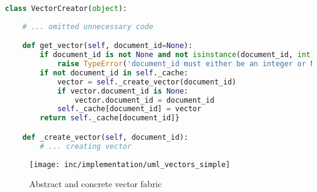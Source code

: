 \begin{lstlisting}[language=Python,caption={Dynamic programming},label={lst:dynamic-programming},float=h]
class VectorCreator(object):
    
    # ... omitted unnecessary code

    def get_vector(self, document_id=None):
        if document_id is not None and not isinstance(document_id, int):
            raise TypeError('document_id must either be an integer or None')
        if not document_id in self._cache:
            vector = self._create_vector(document_id)
            if vector.document_id is None:
                vector.document_id = document_id
            self._cache[document_id] = vector
        return self._cache[document_id]}

    def _create_vector(self, document_id):
        # ... creating vector
\end{lstlisting}


\begin{figure}[h]
    \center
    \texttt{[image: inc/implementation/uml\_vectors\_simple]}
    \caption{Abstract and concrete vector fabric}
    \label{fig:uml-vectorssimple}
\end{figure}

